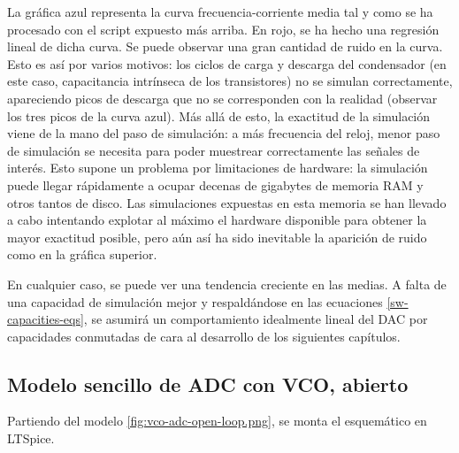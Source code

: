 \documentclass[12pt]{report} %
\begin{document}
	La gráfica azul representa la curva frecuencia-corriente media tal y como se ha procesado con el script expuesto más arriba. En rojo, se ha hecho una regresión lineal de dicha curva. Se puede observar una gran cantidad de ruido en la curva. Esto es así por varios motivos: los ciclos de carga y descarga del condensador (en este caso, capacitancia intrínseca de los transistores) no se simulan correctamente, apareciendo picos de descarga que no se corresponden con la realidad (observar los tres picos de la curva azul). Más allá de esto, la exactitud de la simulación viene de la mano del paso de simulación: a más frecuencia del reloj, menor paso de simulación se necesita para poder muestrear correctamente las señales de interés. Esto supone un problema por limitaciones de hardware: la simulación puede llegar rápidamente a ocupar decenas de gigabytes de memoria RAM y otros tantos de disco. Las simulaciones expuestas en esta memoria se han llevado a cabo intentando explotar al máximo el hardware disponible para obtener la mayor exactitud posible, pero aún así ha sido inevitable la aparición de ruido como en la gráfica superior.
	
	En cualquier caso, se puede ver una tendencia creciente en las medias. A falta de una capacidad de simulación mejor y respaldándose en las ecuaciones \ref{sw-capacities-eqs}, se asumirá un comportamiento idealmente lineal del DAC por capacidades conmutadas de cara al desarrollo de los siguientes capítulos.
	
	\subsection{Modelo sencillo de ADC con VCO, abierto}
	
	Partiendo del modelo \ref{fig:vco-adc-open-loop.png}, se monta el esquemático en LTSpice.
	
\end{document}
